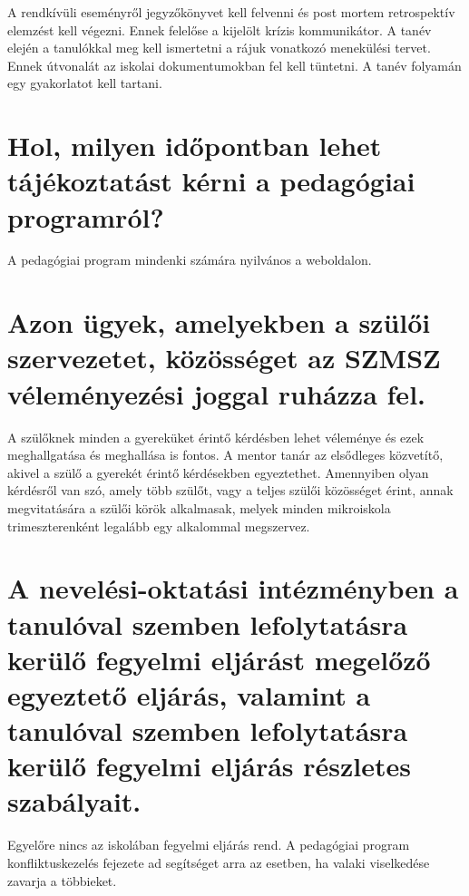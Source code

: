 A rendkívüli eseményről jegyzőkönyvet kell felvenni és post mortem retrospektív elemzést kell végezni. Ennek felelőse a kijelölt krízis kommunikátor. A tanév elején a tanulókkal meg kell ismertetni a rájuk vonatkozó menekülési tervet. Ennek útvonalát az iskolai dokumentumokban fel kell tüntetni. A tanév folyamán egy gyakorlatot kell tartani. 


\section{Hol, milyen időpontban lehet tájékoztatást kérni a pedagógiai programról?}
A pedagógiai program mindenki számára nyilvános a weboldalon.

\section{Azon ügyek, amelyekben a szülői szervezetet, közösséget az SZMSZ véleményezési joggal ruházza fel.}
A szülőknek minden a gyereküket érintő kérdésben lehet  véleménye és ezek meghallgatása és meghallása is fontos. A mentor tanár az elsődleges közvetítő, akivel a szülő a gyerekét érintő kérdésekben egyeztethet. Amennyiben olyan kérdésről van szó, amely több szülőt, vagy a teljes szülői közösséget érint, annak megvitatására a szülői körök alkalmasak, melyek minden mikroiskola trimeszterenként legalább egy alkalommal megszervez. 

\section{A nevelési-oktatási intézményben a tanulóval szemben lefolytatásra kerülő fegyelmi eljárást megelőző egyeztető eljárás, valamint a tanulóval szemben lefolytatásra kerülő fegyelmi eljárás részletes szabályait.}
Egyelőre nincs az iskolában fegyelmi eljárás rend. A pedagógiai program konfliktuskezelés fejezete ad segítséget arra az esetben, ha valaki viselkedése zavarja a többieket.

